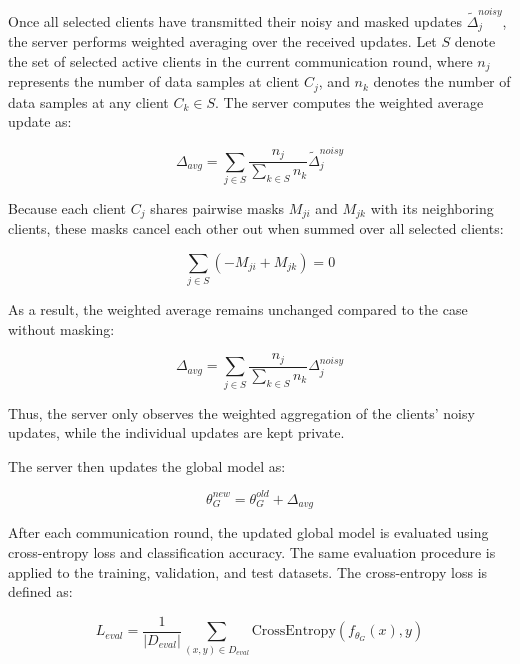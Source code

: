\documentclass[a4paper,fleqn]{cas-dc}
\begin{document}
Once all selected clients have transmitted their noisy and masked updates ${\widetilde{\Delta}}_{j}^{noisy}$, the server performs weighted averaging over the received updates. Let $S$ denote the set of selected active clients in the current communication round, where $n_{j}$ represents the number of data samples at client $C_{j}$, and $n_{k}$ denotes the number of data samples at any client $C_{k} \in S$. The server computes the weighted average update as:

\begin{equation}
\Delta_{avg} = \sum_{j \in S}{\frac{n_{j}}{\sum_{k \in S}n_{k}} {\widetilde{\Delta}}_{j}^{noisy}}
\label{eq:7}
\end{equation}

Because each client $C_{j}$ shares pairwise masks $M_{ji}$ and $M_{jk}$ with its neighboring clients, these masks cancel each other out when summed over all selected clients:

\begin{equation}
\sum_{j \in S}{\left( - M_{ji} + M_{jk} \right) = 0}
\label{eq:8}
\end{equation}

As a result, the weighted average remains unchanged compared to the case without masking:

\begin{equation}
\Delta_{avg} = \sum_{j \in S}{\frac{n_{j}}{\sum_{k \in S}n_{k}} \Delta_{j}^{noisy}}
\label{eq:9}
\end{equation}

Thus, the server only observes the weighted aggregation of the clients' noisy updates, while the individual updates are kept private.

The server then updates the global model as:

\begin{equation}
\theta_{G}^{new} = \theta_{G}^{old} + \Delta_{avg}
\label{eq:10}
\end{equation}

After each communication round, the updated global model is evaluated using cross-entropy loss and classification accuracy. The same evaluation procedure is applied to the training, validation, and test datasets. The cross-entropy loss is defined as:

\begin{equation}
L_{eval} = \frac{1}{\left| D_{eval} \right|} \sum_{(x, y) \in D_{eval}}{\mathrm{CrossEntropy}\left( f_{\theta_{G}}(x),y \right)}
\label{eq:11}
\end{equation}
\end{document}
